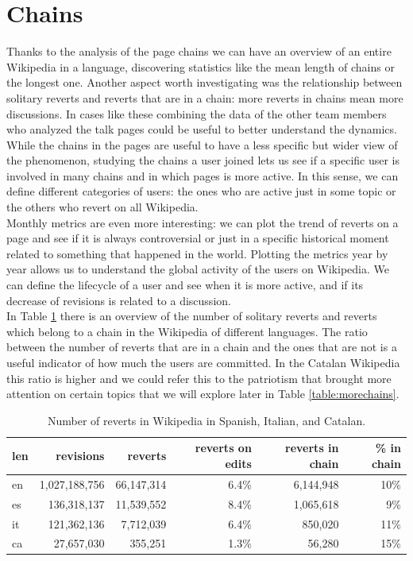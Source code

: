 \section{Chains}
Thanks to the analysis of the page chains we can have an overview of an entire Wikipedia in a
language, discovering statistics like the mean length of chains or the longest one. Another aspect
worth investigating was the relationship between solitary reverts and reverts that are in a chain: more
reverts in chains mean more discussions. In cases like these combining the data of the other team
members who analyzed the talk pages could be useful to better understand the dynamics. While the chains in
the pages are useful to have a less specific but wider view of the phenomenon, studying the chains a
user joined lets us see if a specific user is involved in many chains and in which pages is more
active. In this sense, we can define different categories of users: the ones who are active just in
some topic or the others who revert on all Wikipedia. \\

Monthly metrics are even more interesting: we can plot the trend of reverts on a page and see if it
is always controversial or just in a specific historical moment related to something that happened
in the world. Plotting the metrics year by year allows us to understand the global activity of the
users on Wikipedia. We can define the lifecycle of a user and see when it is more active, and if
its decrease of revisions is related to a discussion.\\


In Table \ref{table:generalstats} there is an overview of the number of solitary reverts and
reverts which belong to a chain in the Wikipedia of different languages. The ratio between the
number of reverts that are in a chain and the ones that are not is a useful indicator of how much
the users are committed. In the Catalan Wikipedia this ratio is higher and we could refer this to
the patriotism that brought more attention on certain topics that we will explore later in Table
\ref{table:morechains}.

\begin{table}[H]
    \centering
    \begin{tabularx}{\columnwidth}{@{}Xrrrrr@{}}
        \midrule
        \textbf{len}& \textbf{revisions} & \textbf{reverts} & \textbf{reverts on edits} & \textbf{reverts in chain} & \textbf{\% in chain} \\ \toprule
        en &1,027,188,756&66,147,314&6.4\%&6,144,948& 10\%\\
        es &136,318,137& 11,539,552&8.4\%& 1,065,618 & 9\% \\
        it &121,362,136& 7,712,039 &6.4\% & 850,020 &  11\% \\
        ca &27,657,030& 355,251 & 1.3\%& 56,280 & 15\% \\
    
        \bottomrule
    \end{tabularx}
    
    \caption{Number of reverts in Wikipedia in Spanish, Italian, and Catalan. \label{table:generalstats}}
\end{table}


